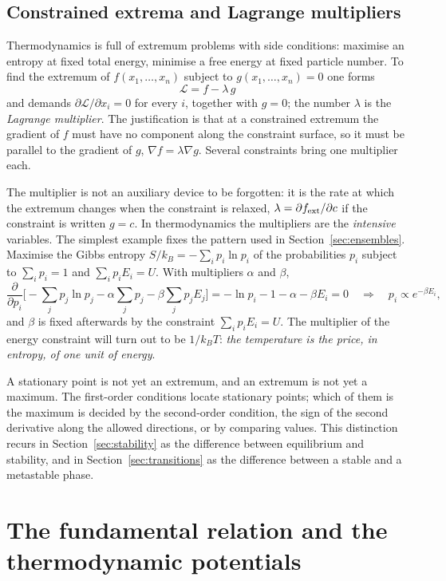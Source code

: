 \documentclass[10pt,a4paper]{article}
\theoremstyle{remark}
\begin{document}
\subsection{Constrained extrema and Lagrange multipliers}
\label{sec:lagrange}

Thermodynamics is full of extremum problems with side conditions: maximise an
entropy at fixed total energy, minimise a free energy at fixed particle number.
To find the extremum of $f(x_1,\dots,x_n)$ subject to $g(x_1,\dots,x_n)=0$ one
forms
\[
  \mathcal{L}=f-\lambda\,g
\]
and demands $\partial\mathcal{L}/\partial x_i=0$ for every $i$, together with
$g=0$; the number $\lambda$ is the \emph{Lagrange multiplier}. The
justification is that at a constrained extremum the gradient of $f$ must have
no component along the constraint surface, so it must be parallel to the
gradient of $g$, $\nabla f=\lambda\nabla g$. Several constraints bring one
multiplier each.

The multiplier is not an auxiliary device to be forgotten: it is the rate at
which the extremum changes when the constraint is relaxed,
$\lambda=\partial f_{\rm ext}/\partial c$ if the constraint is written $g=c$.
In thermodynamics the multipliers are the \emph{intensive} variables. The simplest
example fixes the pattern used in Section~\ref{sec:ensembles}. Maximise the
Gibbs entropy $S/k_B=-\sum_ip_i\ln p_i$ of the probabilities $p_i$ subject to
$\sum_ip_i=1$ and $\sum_ip_iE_i=U$. With multipliers $\alpha$ and $\beta$,
\[
  \frac{\partial}{\partial p_i}\Big[-\sum_jp_j\ln p_j-\alpha\sum_jp_j-\beta\sum_jp_jE_j\Big]
  =-\ln p_i-1-\alpha-\beta E_i=0
  \quad\Longrightarrow\quad
  p_i\propto e^{-\beta E_i} ,
\]
and $\beta$ is fixed afterwards by the constraint $\sum_ip_iE_i=U$. The
multiplier of the energy constraint will turn out to be $1/k_BT$:
\emph{the temperature is the price, in entropy, of one unit of energy}.

A stationary point is not yet an extremum, and an extremum is not yet a
maximum. The first-order conditions locate stationary points; which of them is
the maximum is decided by the second-order condition, the sign of the second
derivative along the allowed directions, or by comparing values. This
distinction recurs in Section~\ref{sec:stability} as the difference between
equilibrium and stability, and in Section~\ref{sec:transitions} as the
difference between a stable and a metastable phase.

\section{The fundamental relation and the thermodynamic potentials}
\label{sec:potentials}
\end{document}
